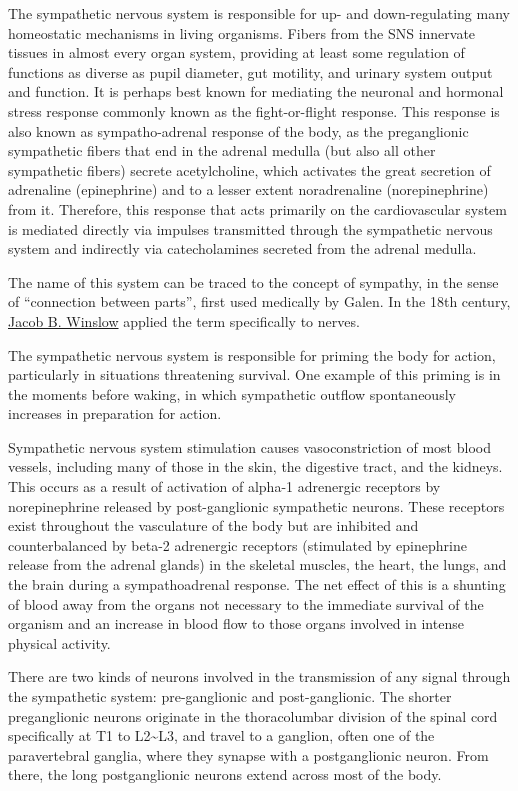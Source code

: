 The sympathetic nervous system is responsible for up- and down-regulating many homeostatic mechanisms in living organisms. Fibers from the SNS innervate tissues in almost every organ system, providing at least some regulation of functions as diverse as pupil diameter, gut motility, and urinary system output and function. It is perhaps best known for mediating the neuronal and hormonal stress response commonly known as the fight-or-flight response. This response is also known as sympatho-adrenal response of the body, as the preganglionic sympathetic fibers that end in the adrenal medulla (but also all other sympathetic fibers) secrete acetylcholine, which activates the great secretion of adrenaline (epinephrine) and to a lesser extent noradrenaline (norepinephrine) from it. Therefore, this response that acts primarily on the cardiovascular system is mediated directly via impulses transmitted through the sympathetic nervous system and indirectly via catecholamines secreted from the adrenal medulla.

The name of this system can be traced to the concept of sympathy, in the sense of ``connection between parts'', first used medically by Galen. In the 18th century, \href{https://en.wikipedia.org/wiki/Jacob_B._Winslow}{Jacob B. Winslow} applied the term specifically to nerves.

The sympathetic nervous system is responsible for priming the body for action, particularly in situations threatening survival. One example of this priming is in the moments before waking, in which sympathetic outflow spontaneously increases in preparation for action.

Sympathetic nervous system stimulation causes vasoconstriction of most blood vessels, including many of those in the skin, the digestive tract, and the kidneys. This occurs as a result of activation of alpha-1 adrenergic receptors by norepinephrine released by post-ganglionic sympathetic neurons. These receptors exist throughout the vasculature of the body but are inhibited and counterbalanced by beta-2 adrenergic receptors (stimulated by epinephrine release from the adrenal glands) in the skeletal muscles, the heart, the lungs, and the brain during a sympathoadrenal response. The net effect of this is a shunting of blood away from the organs not necessary to the immediate survival of the organism and an increase in blood flow to those organs involved in intense physical activity.

There are two kinds of neurons involved in the transmission of any signal through the sympathetic system: pre-ganglionic and post-ganglionic. The shorter preganglionic neurons originate in the thoracolumbar division of the spinal cord specifically at T1 to L2\textasciitilde{}L3, and travel to a ganglion, often one of the paravertebral ganglia, where they synapse with a postganglionic neuron. From there, the long postganglionic neurons extend across most of the body.

